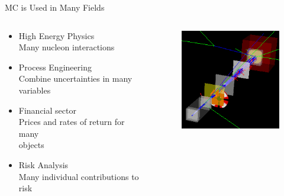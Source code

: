 \documentclass[xcolor=x11names,compress, handout]{beamer}
\renewcommand{\(}{\begin{columns}}
\renewcommand{\)}{\end{columns}}
\newcommand{\<}[1]{\begin{column}{#1}}
\renewcommand{\>}{\end{column}}
\begin{document}
\begin{frame}{MC is Used in Many Fields}

\begin{columns}
  \begin{column}{0.6\textwidth}
  \begin{itemize}
\item High Energy Physics \\
\hspace*{1em} Many nucleon interactions
\item Process Engineering \\
\hspace*{1em} Combine uncertainties in many\\
\hspace*{1em} variables
\item Financial sector \\
\hspace*{1em} Prices and rates of return for many \\
\hspace*{1em}objects
\item Risk Analysis \\
\hspace*{1em} Many individual contributions to \\
\hspace*{1em}risk
\end{itemize}
  \end{column}
  \begin{column}{0.4\textwidth}
  	\begin{figure}
  	\begin{center}
  		\includegraphics[height=1.75in,clip]{cco-beam}
	\end{center}
  	\end{figure}
  \end{column}
\end{columns}

\end{frame}
\end{document}

